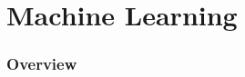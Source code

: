 \documentclass[a4paper]{article}
\begin{document}
\section{Machine Learning}
\subsubsection{Overview} %
\end{document}
